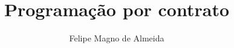 \documentclass[12pt]{article}
\title{Programação por contrato}
\author{Felipe Magno de Almeida}
\begin{document}
 

\maketitle
     
\begin{resumo} 
  
\end{resumo}
\end{document}
